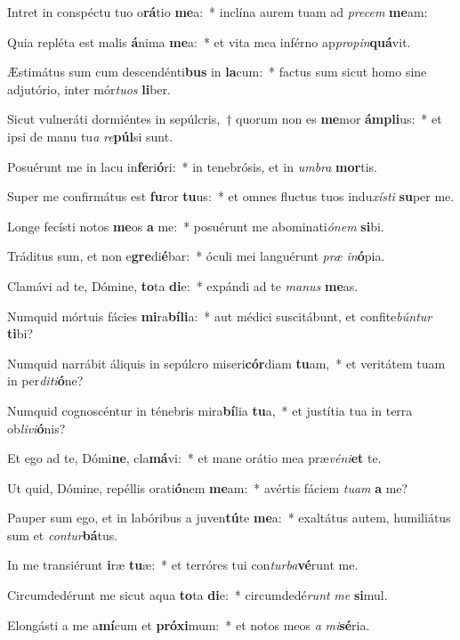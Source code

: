 \item Intret in conspéctu tuo o\textbf{rá}tio \textbf{me}a:~* inclína aurem tuam ad \textit{pre}\textit{cem} \textbf{me}am:
\item Quia repléta est malis \textbf{á}nima \textbf{me}a:~* et vita mea inférno ap\textit{pro}\textit{pin}\textbf{quá}vit.
\item Æstimátus sum cum descendénti\textbf{bus} in \textbf{la}cum:~* factus sum sicut homo sine adjutório, inter mór\textit{tu}\textit{os} \textbf{li}ber.
\item Sicut vulneráti dormiéntes in sepúlcris,~† quorum non es \textbf{me}mor \textbf{ám}\textbf{pli}us:~* et ipsi de manu tu\textit{a} \textit{re}\textbf{púl}si sunt.
\item Posuérunt me in lacu in\textbf{fe}ri\textbf{ó}ri:~* in tenebrósis, et in \textit{um}\textit{bra} \textbf{mor}tis.
\item Super me confirmátus est \textbf{fu}ror \textbf{tu}us:~* et omnes fluctus tuos indu\textit{xís}\textit{ti} \textbf{su}per me.
\item Longe fecísti notos \textbf{me}os \textbf{a} me:~* posuérunt me abominati\textit{ó}\textit{nem} \textbf{si}bi.
\item Tráditus sum, et non e\textbf{gre}di\textbf{é}bar:~* óculi mei languérunt \textit{præ} \textit{in}\textbf{ó}pia.
\item Clamávi ad te, Dómine, \textbf{to}ta \textbf{di}e:~* expándi ad te \textit{ma}\textit{nus} \textbf{me}as.
\item Numquid mórtuis fácies \textbf{mi}ra\textbf{bí}\textbf{li}a:~* aut médici suscitábunt, et confite\textit{bún}\textit{tur} \textbf{ti}bi?
\item Numquid narrábit áliquis in sepúlcro miseri\textbf{cór}diam \textbf{tu}am,~* et veritátem tuam in per\textit{di}\textit{ti}\textbf{ó}ne?
\item Numquid cognoscéntur in ténebris mira\textbf{bí}lia \textbf{tu}a,~* et justítia tua in terra ob\textit{li}\textit{vi}\textbf{ó}nis?
\item Et ego ad te, Dómi\textbf{ne}, cla\textbf{má}vi:~* et mane orátio mea præ\textit{vé}\textit{ni}\textbf{et} te.
\item Ut quid, Dómine, repéllis orati\textbf{ó}nem \textbf{me}am:~* avértis fáciem \textit{tu}\textit{am} \textbf{a} me?
\item Pauper sum ego, et in labóribus a juven\textbf{tú}te \textbf{me}a:~* exaltátus autem, humiliátus sum et \textit{con}\textit{tur}\textbf{bá}tus.
\item In me transiérunt \textbf{i}ræ \textbf{tu}æ:~* et terróres tui con\textit{tur}\textit{ba}\textbf{vé}runt me.
\item Circumdedérunt me sicut aqua \textbf{to}ta \textbf{di}e:~* circumdedé\textit{runt} \textit{me} \textbf{si}mul.
\item Elongásti a me a\textbf{mí}cum et \textbf{pró}\textbf{xi}mum:~* et notos meos \textit{a} \textit{mi}\textbf{sé}ria.

